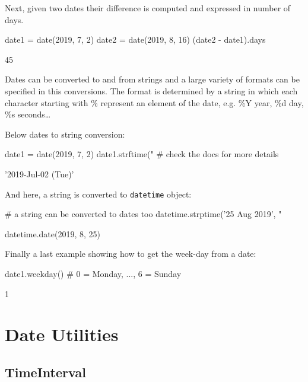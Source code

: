 Next, given two dates their difference is computed and expressed in number of days.

\begin{ipythonnon}
date1 = date(2019, 7, 2)
date2 = date(2019, 8, 16)
(date2 - date1).days
\end{ipythonnon}
\begin{ioutput}
45
\end{ioutput}

Dates can be converted to and from strings and a large variety of formats can be specified in this conversions. 
The format is determined by a string in which each character starting with \% represent an element 
of the date, e.g. \%Y year, \%d day, \%s seconds\ldots

Below dates to string conversion:

\begin{ipythonnon}
date1 = date(2019, 7, 2)
date1.strftime("%
                                # check the docs for more details
\end{ipythonnon}
\begin{ioutput}
'2019-Jul-02 (Tue)'
\end{ioutput}

And here, a string is converted to \texttt{datetime} object:

\begin{ipythonnon}
# a string can be converted to dates too
datetime.strptime('25 Aug 2019', "%
\end{ipythonnon}
\begin{ioutput}
datetime.date(2019, 8, 25)
\end{ioutput}

Finally a last example showing how to get the week-day from a date:

\begin{ipythonnon}
date1.weekday() # 0 = Monday, ..., 6 = Sunday
\end{ipythonnon}
\begin{ioutput}
1
\end{ioutput}

\section{Date Utilities}

\subsection{TimeInterval}

